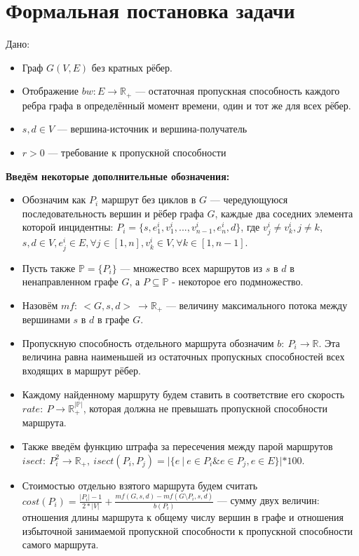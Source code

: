 \documentclass[a4paper]{article}
\begin{document}
\section{Формальная постановка задачи}
Дано:
\begin{itemize}
\item Граф $G(V, E)$ без кратных рёбер.
\item Отображение $bw: E \to \mathbb{R}_+$ --- остаточная пропускная способность каждого ребра графа в определённый момент времени, один и тот же для всех рёбер.
\item $s, d \in V$ --- вершина-источник и вершина-получатель
\item $r>0$ --- требование к пропускной способности 
\end{itemize}
\textbf{Введём некоторые дополнительные обозначения:}
\begin{itemize}

\item Обозначим как $P_i$ маршрут без циклов в $G$ --- чередующуюся последовательность вершин и рёбер графа $G$, каждые два соседних элемента которой инцидентны: $P_i = \{s, e^i_1, v^i_1, ..., v^i_{n-1}, e^i_n, d\}$, где $v^i_j \ne v^i_k, j \ne k$, $s, d \in V, e^i_j \in E, \forall j \in [1, n], v^i_k \in V, \forall k \in [1, n-1] $.

\item Пусть также $\mathbb{P} = \{P_i\}$ --- множество всех маршрутов из $s$ в $d$ в ненаправленном графе $G$, а $P \subseteq \mathbb{P}$ - некоторое его подмножество.

\item Назовём $mf:\ <G, s, d>\ \to \mathbb{R_+}$ --- величину максимального потока между вершинами $s$ в $d$ в графе $G$.

\item Пропускную способность отдельного маршрута обозначим $b:\ P_i \to \mathbb{R}$. Эта величина равна наименьшей из  остаточных пропускных способностей всех входящих в маршрут рёбер.

\item Каждому найденному маршруту будем ставить в соответствие его скорость $rate:\  P \to \mathbb{R_+^{|P|}}$, которая должна не превышать пропускной способности маршрута. 

\item Также введём функцию штрафа за пересечения между парой маршрутов $isect:\ P_i^2 \to \mathbb{R}_+,\ isect(P_i, P_j) = |\{e\ |\ e \in P_i \& e \in P_j, e \in E\}|*100$.

\item Стоимостью отдельно взятого маршрута будем считать $cost(P_i) = \frac{|P_i| - 1}{2*|V|} + \frac{mf(G, s, d) - mf(G \setminus P_i, s, d)}{b(P_i)}$ --- сумму двух величин: отношения длины маршрута к общему числу вершин в графе и отношения избыточной занимаемой пропускной способности к пропускной способности самого маршрута.


\end{itemize}
\end{document}
